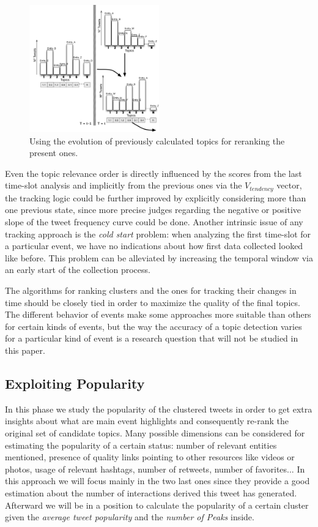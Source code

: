 \documentclass{sig-alternate}
\begin{document}
\begin{figure}[h!]
\centering
\includegraphics[width=0.5\textwidth]{figure/Tracking.png}
\caption{Using the evolution of previously calculated topics for reranking the present ones.}
\label{fig:Tracking}
\end{figure}

Even the topic relevance order is directly influenced by the scores from the last time-slot analysis and implicitly from the previous ones via the $V_{tendency}$ vector, the tracking logic could be further improved by explicitly considering more than one previous state, since more precise judges regarding the negative or positive slope of the tweet frequency curve could be done. Another intrinsic issue of any tracking approach is the \textit{cold start} problem: when analyzing the first time-slot for a particular event, we have no indications about how first data collected looked like before. This problem can be alleviated by increasing the temporal window via an early start of the collection process.

The algorithms for ranking clusters and the ones for tracking their changes in time should be closely tied in order to maximize the quality of the final topics. The different behavior of events make some approaches more suitable than others for certain kinds of events, but the way the accuracy of a topic detection varies for a particular kind of event is a research question that will not be studied in this paper.

\subsection{Exploiting Popularity}

In this phase we study the popularity of the clustered tweets in order to get extra insights about what are main event highlights and consequently re-rank the original set of candidate topics. Many possible dimensions can be considered for estimating the popularity of a certain status: number of relevant entities mentioned, presence of quality links pointing to other resources like videos or photos, usage of relevant hashtags, number of retweets, number of favorites... In this approach we will focus mainly in the two last ones since they provide a good estimation about the number of interactions derived this tweet has generated. Afterward we will be in a position to calculate the popularity of a certain cluster given the \textit{average tweet popularity} and the \textit{number of Peaks} inside.
\end{document}
